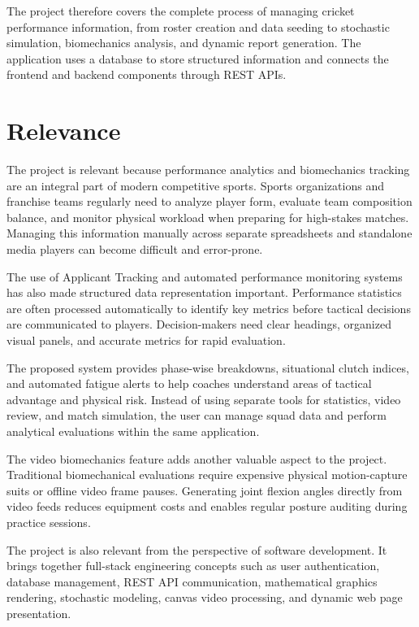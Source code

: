 The project therefore covers the complete process of managing cricket performance information, from roster creation and data seeding to stochastic simulation, biomechanics analysis, and dynamic report generation. The application uses a database to store structured information and connects the frontend and backend components through REST APIs.

\section{Relevance}
The project is relevant because performance analytics and biomechanics tracking are an integral part of modern competitive sports. Sports organizations and franchise teams regularly need to analyze player form, evaluate team composition balance, and monitor physical workload when preparing for high-stakes matches. Managing this information manually across separate spreadsheets and standalone media players can become difficult and error-prone.

The use of Applicant Tracking and automated performance monitoring systems has also made structured data representation important. Performance statistics are often processed automatically to identify key metrics before tactical decisions are communicated to players. Decision-makers need clear headings, organized visual panels, and accurate metrics for rapid evaluation.

The proposed system provides phase-wise breakdowns, situational clutch indices, and automated fatigue alerts to help coaches understand areas of tactical advantage and physical risk. Instead of using separate tools for statistics, video review, and match simulation, the user can manage squad data and perform analytical evaluations within the same application.

The video biomechanics feature adds another valuable aspect to the project. Traditional biomechanical evaluations require expensive physical motion-capture suits or offline video frame pauses. Generating joint flexion angles directly from video feeds reduces equipment costs and enables regular posture auditing during practice sessions.

The project is also relevant from the perspective of software development. It brings together full-stack engineering concepts such as user authentication, database management, REST API communication, mathematical graphics rendering, stochastic modeling, canvas video processing, and dynamic web page presentation.

